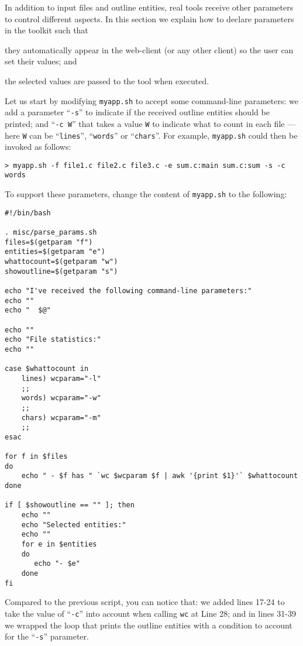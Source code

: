 In addition to input files and outline entities, real tools
receive other parameters to control different aspects. In this section
we explain how to declare parameters in the \ei toolkit such that
\begin{inparaenum}
\item they automatically appear in the web-client (or any other
  client) so the user can set their values; and
\item the selected values are passed to the tool when executed.
\end{inparaenum}

Let us start by modifying \texttt{myapp.sh} to accept some
command-line parameters: we add a parameter ``\texttt{-s}'' to
indicate if the received outline entities should be printed; and
``\texttt{-c W}'' that takes a value \texttt{W} to indicate what to
count in each file --- here \texttt{W} can be ``\texttt{lines}'',
``\texttt{words}'' or ``\texttt{chars}''.
%
For example, \texttt{myapp.sh} could then be invoked as follows:


\medskip
\begin{lstlisting}
> myapp.sh -f file1.c file2.c file3.c -e sum.c:main sum.c:sum -s -c words
\end{lstlisting}

\medskip
\noindent
To support these parameters, change the content of \texttt{myapp.sh}
to the following:

\medskip
\begin{lstlisting}[style=script]
#!/bin/bash

. misc/parse_params.sh
files=$(getparam "f")
entities=$(getparam "e")
whattocount=$(getparam "w")
showoutline=$(getparam "s")

echo "I've received the following command-line parameters:"
echo ""
echo "  $@"

echo ""
echo "File statistics:"
echo ""

case $whattocount in
    lines) wcparam="-l"
    ;;
    words) wcparam="-w"
    ;;
    chars) wcparam="-m"
    ;;
esac

for f in $files 
do
    echo " - $f has " `wc $wcparam $f | awk '{print $1}'` $whattocount
done

if [ $showoutline == "" ]; then
    echo ""
    echo "Selected entities:"
    echo ""
    for e in $entities 
    do
       echo "- $e"
    done
fi
\end{lstlisting}

\medskip
\noindent
Compared to the previous script, you can notice that: we added lines
17-24 to take the value of ``\texttt{-c}'' into account when calling
\texttt{wc} at Line 28; and in lines 31-39 we wrapped the loop that
prints the outline entities with a condition to account for the
``\texttt{-s}'' parameter.


